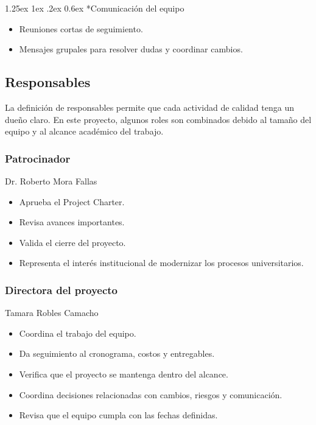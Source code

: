 \documentclass[11pt,spanish]{article}
\makeatletter
\renewcommand\paragraph{\@startsection{paragraph}{4}{\z@}%
  {1.25ex \@plus1ex \@minus.2ex}%
  {0.6ex}%
  {\normalfont\normalsize\bfseries}}
\makeatother
\begin{document}
\paragraph*{Comunicación del equipo}

\begin{itemize}
    \item Reuniones cortas de seguimiento.
    \item Mensajes grupales para resolver dudas y coordinar cambios.
\end{itemize}

\subsection{Responsables}

La definición de responsables permite que cada actividad de calidad tenga un dueño claro. En este proyecto, algunos roles son combinados debido al tamaño del equipo y al alcance académico del trabajo.

\subsubsection*{Patrocinador}
Dr. Roberto Mora Fallas

\begin{itemize}
    \item Aprueba el Project Charter.
    \item Revisa avances importantes.
    \item Valida el cierre del proyecto.
    \item Representa el interés institucional de modernizar los procesos universitarios.
\end{itemize}

\subsubsection*{Directora del proyecto}
Tamara Robles Camacho

\begin{itemize}
    \item Coordina el trabajo del equipo.
    \item Da seguimiento al cronograma, costos y entregables.
    \item Verifica que el proyecto se mantenga dentro del alcance.
    \item Coordina decisiones relacionadas con cambios, riesgos y comunicación.
    \item Revisa que el equipo cumpla con las fechas definidas.
\end{itemize}
\end{document}
